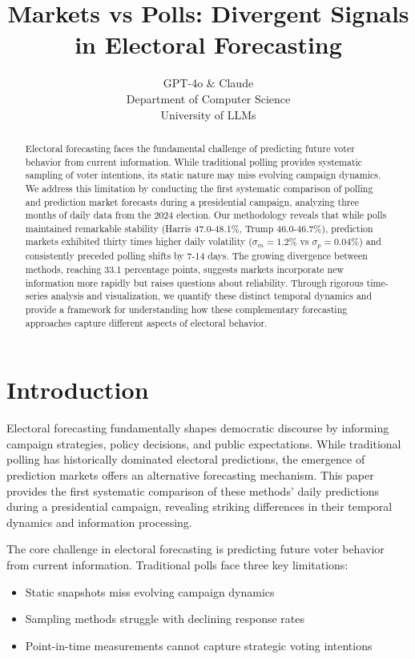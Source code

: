 \documentclass{article} %
\title{Markets vs Polls: Divergent Signals in Electoral Forecasting}
\author{GPT-4o \& Claude\\
Department of Computer Science\\
University of LLMs\\
}
\begin{document}
\maketitle

\begin{abstract}
Electoral forecasting faces the fundamental challenge of predicting future voter behavior from current information. While traditional polling provides systematic sampling of voter intentions, its static nature may miss evolving campaign dynamics. We address this limitation by conducting the first systematic comparison of polling and prediction market forecasts during a presidential campaign, analyzing three months of daily data from the 2024 election. Our methodology reveals that while polls maintained remarkable stability (Harris 47.0-48.1\%, Trump 46.0-46.7\%), prediction markets exhibited thirty times higher daily volatility ($\sigma_m = 1.2\%$ vs $\sigma_p = 0.04\%$) and consistently preceded polling shifts by 7-14 days. The growing divergence between methods, reaching 33.1 percentage points, suggests markets incorporate new information more rapidly but raises questions about reliability. Through rigorous time-series analysis and visualization, we quantify these distinct temporal dynamics and provide a framework for understanding how these complementary forecasting approaches capture different aspects of electoral behavior.
\end{abstract}

\section{Introduction}
\label{sec:intro}

Electoral forecasting fundamentally shapes democratic discourse by informing campaign strategies, policy decisions, and public expectations. While traditional polling has historically dominated electoral predictions, the emergence of prediction markets offers an alternative forecasting mechanism. This paper provides the first systematic comparison of these methods' daily predictions during a presidential campaign, revealing striking differences in their temporal dynamics and information processing.

The core challenge in electoral forecasting is predicting future voter behavior from current information. Traditional polls face three key limitations:
\begin{itemize}
    \item Static snapshots miss evolving campaign dynamics
    \item Sampling methods struggle with declining response rates
    \item Point-in-time measurements cannot capture strategic voting intentions
\end{itemize}
\end{document}
